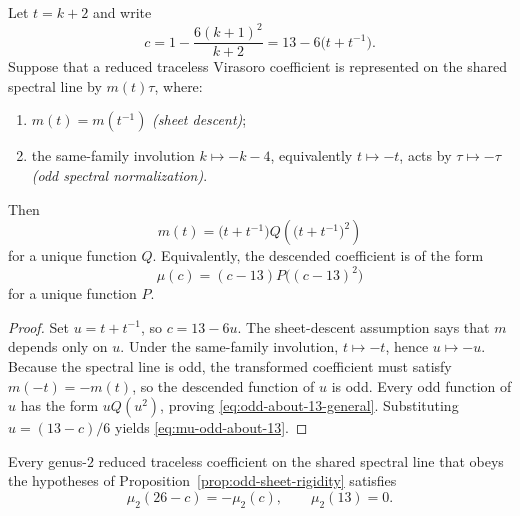 \begin{proposition}
\label{prop:odd-sheet-rigidity}
Let \(t=k+2\) and write
\begin{equation}
\label{eq:vir-sheet-coordinate}
 c=1-\frac{6(k+1)^2}{k+2}=13-6\bigl(t+t^{-1}\bigr).
\end{equation}
Suppose that a reduced traceless Virasoro coefficient is represented on
the shared spectral line by \(m(t)\tau\), where:
\begin{enumerate}[label=\textup{(\roman*)}]
\item \(m(t)=m(t^{-1})\) \emph{(sheet descent)};
\item the same-family involution \(k\mapsto -k-4\), equivalently
 \(t\mapsto -t\), acts by \(\tau\mapsto -\tau\)
 \emph{(odd spectral normalization)}.
\end{enumerate}
Then
\begin{equation}
\label{eq:odd-about-13-general}
 m(t)=\bigl(t+t^{-1}\bigr)
 Q\!\left(\bigl(t+t^{-1}\bigr)^2\right)
\end{equation}
for a unique function \(Q\). Equivalently, the descended coefficient is
of the form
\begin{equation}
\label{eq:mu-odd-about-13}
 \mu(c)=(c-13)P\bigl((c-13)^2\bigr)
\end{equation}
for a unique function \(P\).
\end{proposition}

\begin{proof}
Set \(u=t+t^{-1}\), so \(c=13-6u\). The sheet-descent assumption says
that \(m\) depends only on \(u\). Under the same-family involution,
\(t\mapsto -t\), hence \(u\mapsto -u\). Because the spectral line is
odd, the transformed coefficient must satisfy
\(m(-t)=-m(t)\), so the descended function of \(u\) is odd. Every odd
function of \(u\) has the form \(uQ(u^2)\), proving
\eqref{eq:odd-about-13-general}. Substituting
\(u=(13-c)/6\) yields \eqref{eq:mu-odd-about-13}.
\end{proof}

\begin{corollary}
\label{cor:mu2-centered-at-13}
Every genus-\(2\) reduced traceless coefficient on the shared spectral
line that obeys the hypotheses of
Proposition~\ref{prop:odd-sheet-rigidity} satisfies
\[
\mu_2(26-c)=-\mu_2(c),
\qquad
\mu_2(13)=0.
\]
\end{corollary}


